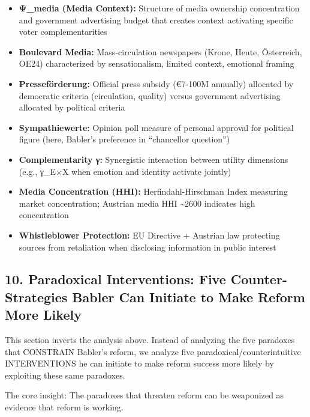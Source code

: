 \begin{itemize}
\item \textbf{Ψ\_media (Media Context):} Structure of media ownership concentration
  and government advertising budget that creates context activating specific
  voter complementarities
\item \textbf{Boulevard Media:} Mass-circulation newspapers (Krone, Heute, Österreich,
  OE24) characterized by sensationalism, limited context, emotional framing
\item \textbf{Presseförderung:} Official press subsidy (€7-100M annually) allocated
  by democratic criteria (circulation, quality) versus government advertising
  allocated by political criteria
\item \textbf{Sympathiewerte:} Opinion poll measure of personal approval for
  political figure (here, Babler's preference in ``chancellor question'')
\item \textbf{Complementarity γ:} Synergistic interaction between utility dimensions
  (e.g., γ_{E×X} when emotion and identity activate jointly)
\item \textbf{Media Concentration (HHI):} Herfindahl-Hirschman Index measuring market
  concentration; Austrian media HHI \textasciitilde 2600 indicates high concentration
\item \textbf{Whistleblower Protection:} EU Directive + Austrian law protecting
  sources from retaliation when disclosing information in public interest
\end{itemize}

\label{sec:dx-paradoxical-interventions}

\subsection*{10. Paradoxical Interventions: Five Counter-Strategies Babler Can Initiate to Make Reform More Likely}

This section inverts the analysis above. Instead of analyzing the five paradoxes that CONSTRAIN Babler's reform,
we analyze five paradoxical/counterintuitive INTERVENTIONS he can initiate to make reform success more likely
by exploiting these same paradoxes.

The core insight: The paradoxes that threaten reform can be weaponized as evidence that reform is working.

